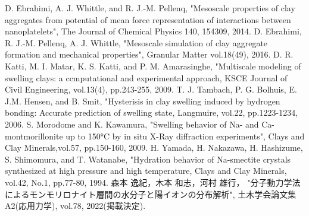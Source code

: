 ﻿\documentclass[11pt,a4j]{jarticle}
\begin{document}
\begin{thebibliography}{99}
	D. Ebrahimi, A. J. Whittle, and R. J.-M. Pellenq, 
	"Mesoscale properties of clay aggregates from potential of mean force representation of
	interactions between nanoplatelets",
	The Journal of Chemical Physics 140, 154309, 2014. 
	D. Ebrahimi, R. J.-M. Pellenq, A. J. Whittle,
	"Mesoscale simulation of clay aggregate formation and mechanical properties",
		Granular Matter vol.18(49), 2016.
	D. R. Katti, M. I. Matar, K. S. Katti, and P. M. Amarasinghe, 
	"Multiscale modeling of swelling clays: a ccmputational and experimental approach, 
	KSCE Journal of Civil Engineering, vol.13(4), pp.243-255, 2009.
	T. J. Tambach, P. G. Bolhuis, E. J.M. Hensen, and B. Smit, 
	"Hysterisis in clay swelling induced by hydrogen bonding: 
		Accurate prediction of swelling state, Langmuire, 
	vol.22, pp.1223-1234, 2006.
	S. Morodome and K. Kawamura, 
	"Swelling behavior of Na- and Ca-montmorillonite up to 150°C by 
	in situ X-Ray diffraction experiments", 
	Clays and Clay Minerals,vol.57, pp.150-160, 2009.
	H. Yamada, H. Nakazawa, H. Hashizume, S. Shimomura, and T. Watanabe, 
	"Hydration behavior of Na-smectite crystals synthesized at high pressure 
	and high temperature, Clays and Clay Minerals, vol.42, No.1, pp.77-80, 1994.
	森本 逸紀，木本 和志，河村 雄行，
	"分子動力学法によるモンモリロナイト層間の水分子と陽イオンの分布解析", 
		土木学会論文集A2(応用力学), vol.78, 2022(掲載決定). 	
\end{thebibliography}
\end{document}
